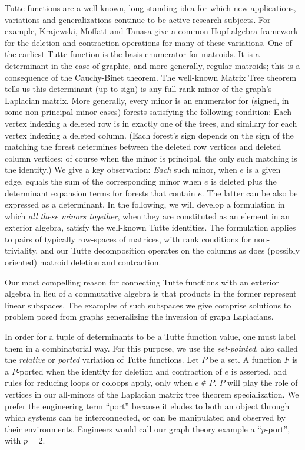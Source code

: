 \documentclass[Unicode]{cedram-alco}
\begin{document}
\noindent

Tutte functions are a well-known, long-standing idea
for which new applications, variations and generalizations
continue to be active research subjects. For example,
Krajewski, Moffatt and Tanasa give a common Hopf algebra framework
for the deletion and contraction operations for many of
these variations\cite{KRAJEWSKI2018271}.
One of the earliest Tutte function is the basis enumerator for matroids. It
is a determinant in the case of graphic, and more generally, regular matroids;
this is a consequence of the Cauchy-Binet theorem.
The well-known Matrix Tree theorem tells us this determinant (up to sign)
is any full-rank minor of the graph's Laplacian matrix. More generally,
every minor is an enumerator for (signed, in some non-principal minor
cases) forests satisfying the following condition: Each vertex indexing
a deleted row is in exactly one of the trees, and similary for each
vertex indexing a deleted column\cite{sdcMTT}. (Each forest's sign depends on the sign of the
matching the forest determines between the deleted row vertices and
deleted column vertices; of course when the minor is principal,
the only such matching is the identity.)
We give a key observation: \emph{Each} such
minor, when $e$ is a given edge, equals the sum of the corresponding
minor when $e$ is deleted plus the determinant expansion terms for
forests that contain $e$.  The latter can be also be expressed as a
determinant.
In the following, we will develop a formulation in which
\emph{all these minors together},
when they are constituted as an element in an exterior algebra, satisfy the
well-known Tutte identities.  The formulation applies to pairs of
typically row-spaces of matrices, with rank conditions for non-triviality,
and our Tutte decomposition operates on the columns as does (possibly oriented)
matroid deletion and contraction.


Our most compelling reason for connecting
Tutte functions with an exterior algebra in lieu of a commutative algebra is that
products in the former represent linear subspaces. The examples of such subspaces
we give comprise solutions to problem posed from graphs generalizing the inversion
of graph Laplacians.  

In order for a tuple of determinants to be a Tutte function value, one
must label them in a combinatorial way.  For this purpose, we use
the \emph{set-pointed}\cite{SetPointedLV}, also called the
\emph{relative}\cite{RelTuttePolyDiaoHetyei} or
\emph{ported}\cite{sdcPorted,TutteEx}
variation of Tutte functions.  Let $P$ be a set.  A function $F$ is a $P$-ported
when the identity for deletion and contraction of $e$ is asserted,
and rules for reducing loops or coloops apply, only when $e \not\in P$.
$P$ will play the role of vertices in our all-minors of the Laplacian
matrix tree theorem specialization.
We prefer the engineering term ``port'' because it eludes to both an object through
which systems can be interconnected, or can be manipulated and observed by their
environments.  Engineers would call our graph theory example a ``$p$-port'', with
$p=2$.
\end{document}
